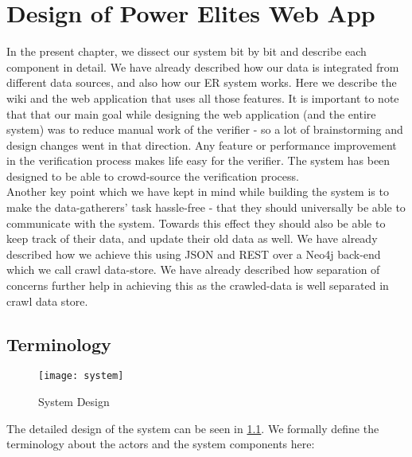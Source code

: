 \chapter{Design of Power Elites Web App}
\label{chapwebapp}

In the present chapter, we dissect our system bit by bit and describe each component in detail. We have already described how our data is integrated from different data sources, and also how our ER system works. Here we describe the wiki and the web application that uses all those features. It is important to note that that our main goal while designing the web application (and the entire system) was to reduce manual work of the verifier - so a lot of brainstorming and design changes went in that direction. Any feature or performance improvement in the verification process makes life easy for the verifier. The system has been designed to be able to crowd-source the verification process. \\

Another key point which we have kept in mind while building the system is to make the 
data-gatherers' task hassle-free - that they should universally be able to communicate with the system. Towards this effect they should also be able to keep track of their data, and update their old data as well. We have already described how we achieve this using JSON and REST over a Neo4j back-end which we call crawl data-store. We have already described how separation of concerns further help in achieving this as the crawled-data is well separated in crawl data store. \\

\section{Terminology}

\begin{figure}[H]
\begin{center}  
\texttt{[image: system]} 
\caption{System Design}
\label{fig:system}
\end{center}
\end{figure}

The detailed design of the system can be seen in \ref{fig:system}. We formally define the terminology about the actors and the system components here:


